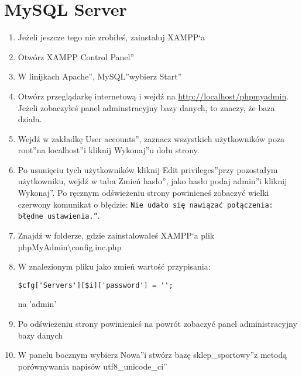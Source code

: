 \documentclass[a4paper, 11pt]{article}
\begin{document}
	\section{MySQL Server}
	\begin{enumerate}
		\item Jeżeli jeszcze tego nie zrobiłeś, zainstaluj XAMPP`a
		\item Otwórz \quotedblbase XAMPP Control Panel\textquotedblright
		\item W linijkach \quotedblbase Apache\textquotedblright , \quotedblbase MySQL\textquotedblright wybierz \quotedblbase Start\textquotedblright
		\item Otwórz przeglądarkę internetową i wejdź na \url{http://localhost/phpmyadmin}. Jeżeli zobaczyłeś panel adminstracyjny bazy danych, to znaczy, że baza działa.
		\item Wejdź w zakładkę \quotedblbase User accounts\textquotedblright, zaznacz wszystkich użytkowników poza \quotedblbase root\textquotedblright na \quotedblbase localhost\textquotedblright i kliknij \quotedblbase Wykonaj\textquotedblright u dołu strony.
		\item Po usunięciu tych użytkowników kliknij \quotedblbase Edit privileges\textquotedblright przy pozostałym użytkowniku, wejdź w taba \quotedblbase Zmień hasło\textquotedblright, jako hasło podaj \quotedblbase admin\textquotedblright i kliknij \quotedblbase Wykonaj\textquotedblright. Po ręcznym odświeżeniu strony powinieneś zobaczyć wielki czerwony komunikat o błędzie: \texttt{\quotedblbase Nie udało się nawiązać połączenia: błędne ustawienia.\textquotedblright}.
		\item Znajdź w folderze, gdzie zainstalowałeś XAMPP`a plik phpMyAdmin\textbackslash config.inc.php
		\item W znalezionym pliku jako zmień wartość przypisania:\\
			\begin{lstlisting}
$cfg['Servers'][$i]['password'] = '';
			\end{lstlisting}
			na 'admin'
		\item Po odświeżeniu strony powinienieś na powrót zobaczyć panel administracyjny bazy danych
		\item W panelu bocznym wybierz \quotedblbase Nowa\textquotedblright i stwórz bazę \quotedblbase sklep{\_}sportowy\textquotedblright z metodą porównywania napisów \quotedblbase utf8{\_}unicode{\_}ci\textquotedblright

\end{enumerate}
\end{document}

